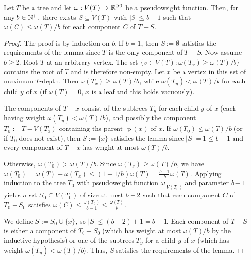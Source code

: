 \documentclass{patmorin}
\renewcommand{\ge}{\geqslant}
\renewcommand{\le}{\leqslant}
\DeclareMathOperator{\parent}{p}
\begin{document}
\begin{lem}\label{bag_separator}
  Let $T$ be a tree and let $\omega:V(T)\to\R^{\ge 0}$ be a pseudoweight function.  Then, for any $b\in\mathbb{N}^+$, there exists $S\subseteq V(T)$ with $|S|\le b-1$ such that $\omega(C)\le \omega(T)/b$ for each component $C$ of $T-S$.
\end{lem}

\begin{proof}
  The proof is by induction on $b$.  If $b=1$, then $S:=\emptyset$ satisfies the requirements of the lemma since $T$ is the only component of $T-S$.  Now assume $b\ge 2$. Root $T$ at an arbitrary vertex. The set $\{v\in V(T):\omega(T_v)\ge \omega(T)/b\}$ contains the root of $T$ and is therefore non-empty. Let $x$ be a vertex in this set of maximum $T$-depth. Then $\omega(T_x)\ge\omega(T)/b$, while $\omega(T_y)<\omega(T)/b$ for each child $y$ of $x$ (if $\omega(T)=0$, $x$ is a leaf and this holds vacuously).

  The components of $T-x$ consist of the subtrees $T_y$ for each child $y$ of $x$ (each having weight $\omega(T_y)<\omega(T)/b$), and possibly the component $T_0 := T-V(T_x)$ containing the parent $\parent(x)$ of $x$. If $\omega(T_0)\le \omega(T)/b$ (or if $T_0$ does not exist), then $S:=\{x\}$ satisfies the lemma since $|S|=1\le b-1$ and every component of $T-x$ has weight at most $\omega(T)/b$.

  Otherwise, $\omega(T_0)>\omega(T)/b$. Since $\omega(T_x)\ge\omega(T)/b$, we have $\omega(T_0)=\omega(T)-\omega(T_x)\le (1-1/b)\omega(T) = \frac{b-1}{b}\omega(T)$. Applying induction to the tree $T_0$ with pseudoweight function $\omega|_{V(T_0)}$ and parameter $b-1$ yields a set $S_0\subseteq V(T_0)$ of size at most $b-2$ such that each component $C$ of $T_0-S_0$ satisfies $\omega(C)\le \frac{\omega(T_0)}{b-1}\le \frac{\omega(T)}{b}$.

  We define $S:=S_0\cup\{x\}$, so $|S|\le (b-2)+1 = b-1$. Each component of $T-S$ is either a component of $T_0-S_0$ (which has weight at most $\omega(T)/b$ by the inductive hypothesis) or one of the subtrees $T_y$ for a child $y$ of $x$ (which has weight $\omega(T_y)<\omega(T)/b$). Thus, $S$ satisfies the requirements of the lemma.
\end{proof}
\end{document}
